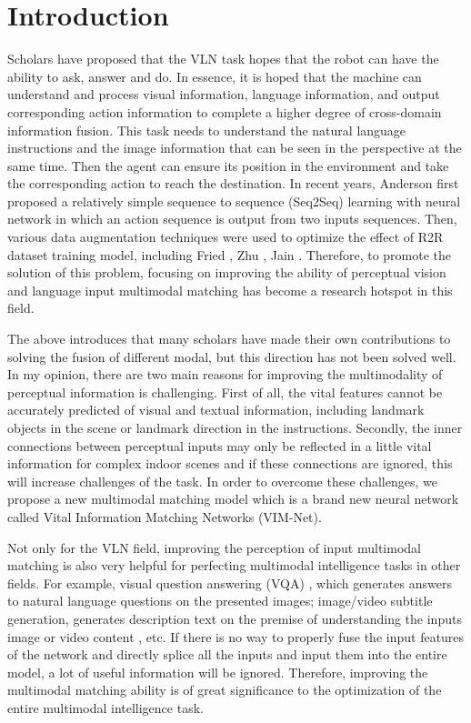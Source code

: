 \section{Introduction}
\label{intro}

Scholars have proposed that the VLN task hopes that the robot can have the ability to ask, answer and do. In essence, it is hoped that the machine can understand and process visual information, language information, and output corresponding action information to complete a higher degree of cross-domain information fusion. This task needs to understand the natural language instructions and the image information that can be seen in the perspective at the same time. Then the agent can ensure its position in the environment and take the corresponding action to reach the destination. In recent years, Anderson \cite{anderson2018vision} first proposed a relatively simple sequence to sequence (Seq2Seq) learning with neural network in which an action sequence is output from two inputs sequences. Then, various data augmentation techniques were used to optimize the effect of R2R dataset training model, including Fried \cite{fried2018speaker}, Zhu \cite{zhu20201vision}, Jain \cite{jain2019stay}. Therefore, to promote the solution of this problem, focusing on improving the ability of perceptual vision and language input multimodal matching has become a research hotspot in this field.

The above introduces that many scholars have made their own contributions to solving the fusion of different modal\cite{fried2018speaker,landi2019embodied,hwang2021joint}, but this direction has not been solved well. In my opinion, there are two main reasons for improving the multimodality of perceptual information is challenging. First of all, the vital features cannot be accurately predicted of visual and textual information, including landmark objects in the scene or landmark direction in the instructions. Secondly, the inner connections between perceptual inputs may only be reflected in a little vital information for complex indoor scenes and if these connections are ignored, this will increase challenges of the task. In order to overcome these challenges, we propose a new multimodal matching model which is a brand new neural network called Vital Information Matching Networks (VIM-Net).

Not only for the VLN field, improving the perception of input multimodal matching is also very helpful for perfecting multimodal intelligence tasks in other fields. For example, visual question answering (VQA) \cite{antol2015vqa}, which generates answers to natural language questions on the presented images; image/video subtitle generation, generates description text on the premise of understanding the inputs image or video content \cite{das2017visual}, etc. If there is no way to properly fuse the input features of the network and directly splice all the inputs and input them into the entire model, a lot of useful information will be ignored. Therefore, improving the multimodal matching ability is of great significance to the optimization of the entire multimodal intelligence task.

